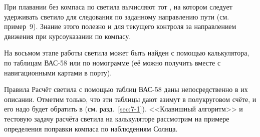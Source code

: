 При плавании без компаса по \IP светила вычисляют тот \KU, на котором
следует удерживать светило для следования по заданному направлению
пути (см. пример~9). Знание этого \KU полезно и для текущего контроля
за направлением движения при курсоуказании по компасу.

На восьмом этапе работы \IP светила может быть найден с помощью
калькулятора, по таблицам ВАС-58 или по номограмме  (её можно
получить вместе с навигационными картами в порту).

Правила Расчёт \IP светила с помощью таблиц ВАС-58 даны
непосредственно в их описании. Отметим только, что эти таблицы дают
азимут в полукруговом счёте, и его надо будет обратить в \IP
(см. разд.~\ref{sec:7-1}).  <<Клавишный алгоритм>> и тестовую задачу
расчёта \IP светила на калькуляторе рассмотрим на примере определения
поправки компаса по наблюдениям Солнца.

